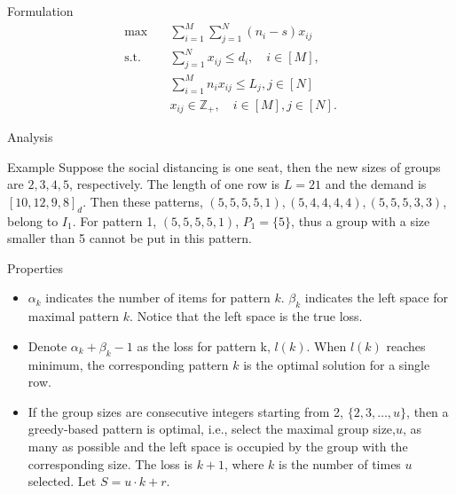     \begin{frame}{Formulation}
      \begin{equation}\label{deter_upper}
        \begin{aligned}
        \max \quad & \sum_{i=1}^{M}  \sum_{j= 1}^{N} (n_i- s) x_{ij} \\
        \text {s.t.} \quad & \sum_{j= 1}^{N} x_{ij} \leq d_{i}, \quad i \in [M], \\
        & \sum_{i=1}^{M} n_{i} x_{ij} \leq L_j, j \in [N] \\
        & x_{ij} \in \mathbb{Z}_{+}, \quad i \in [M], j \in [N].
        \end{aligned}
      \end{equation}
    \end{frame}

    \begin{frame}{Analysis}

    \end{frame}

    \begin{frame}{Example}
      Suppose the social distancing is one seat, then the new sizes of groups are $2, 3, 4, 5$, respectively. The length of one row is $L = 21$ and the demand is $[10, 12, 9, 8]_d$. Then these patterns, $(5, 5, 5, 5, 1), (5, 4, 4, 4, 4),(5, 5, 5, 3, 3)$, belong to $I_1$. For pattern 1, $(5, 5, 5, 5, 1)$, $P_{1} = \{5\}$, thus a group with a size smaller than 5 cannot be put in this pattern.
    \end{frame}

    \begin{frame}{Properties}
      \begin{itemize}
        \item $\alpha_k$ indicates the number of items for pattern $k$. $\beta_k$ indicates the left space for maximal pattern $k$. Notice that the left space is the true loss.
        \item Denote $\alpha_k + \beta_k- 1$ as the loss for pattern k, $l(k)$. When $l(k)$ reaches minimum, the corresponding pattern $k$ is the optimal solution for a single row.
        \item If the group sizes are consecutive integers starting from 2, $\{2,3,\ldots,u\}$, then a greedy-based pattern is optimal, i.e., select the maximal group size,$u$, as many as possible and the left space is occupied by the group with the corresponding size. The loss is $k+1$, where $k$ is the number of times $u$ selected. Let $S = u\cdot k + r$.
      \end{itemize}
    \end{frame}

